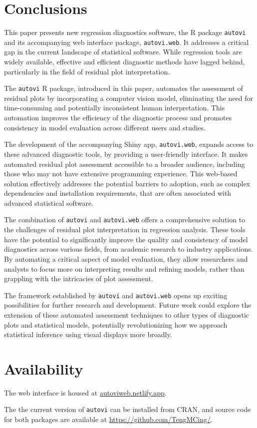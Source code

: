 \documentclass[
doublespace,
  times]{anzsauth}
\begin{document}
\section{Conclusions}\label{sec-autovi-conclusion}

This paper presents new regression diagnostics software, the R package
\texttt{autovi} and its accompanying web interface package,
\texttt{autovi.web}. It addresses a critical gap in the current
landscape of statistical software. While regression tools are widely
available, effective and efficient diagnostic methods have lagged
behind, particularly in the field of residual plot interpretation.

The \texttt{autovi} R package, introduced in this paper, automates the
assessment of residual plots by incorporating a computer vision model,
eliminating the need for time-consuming and potentially inconsistent
human interpretation. This automation improves the efficiency of the
diagnostic process and promotes consistency in model evaluation across
different users and studies.

The development of the accompanying Shiny app, \texttt{autovi.web},
expands access to these advanced diagnostic tools, by providing a
user-friendly interface. It makes automated residual plot assessment
accessible to a broader audience, including those who may not have
extensive programming experience. This web-based solution effectively
addresses the potential barriers to adoption, such as complex
dependencies and installation requirements, that are often associated
with advanced statistical software.

The combination of \texttt{autovi} and \texttt{autovi.web} offers a
comprehensive solution to the challenges of residual plot interpretation
in regression analysis. These tools have the potential to significantly
improve the quality and consistency of model diagnostics across various
fields, from academic research to industry applications. By automating a
critical aspect of model evaluation, they allow researchers and analysts
to focus more on interpreting results and refining models, rather than
grappling with the intricacies of plot assessment.

The framework established by \texttt{autovi} and \texttt{autovi.web}
opens up exciting possibilities for further research and development.
Future work could explore the extension of these automated assessment
techniques to other types of diagnostic plots and statistical models,
potentially revolutionizing how we approach statistical inference using
visual displays more broadly.

\section{Availability}\label{availability}

The web interface is housed at \url{autoviweb.netlify.app}.

The the current version of \texttt{autovi} can be installed from CRAN,
and source code for both packages are available at
\url{https://github.com/TengMCing/}.


  
\end{document}
